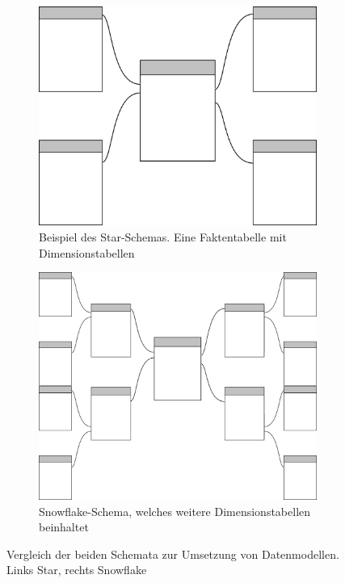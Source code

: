\begin{figure}[ht]
\begin{subfigure}{0.5\linewidth}
  \centering
  \includegraphics[width=0.95\linewidth]{img/starScheme}  
  \caption{Beispiel des Star-Schemas. Eine Faktentabelle mit Dimensionstabellen}
  \label{fig:starscheme}
\end{subfigure}
\begin{subfigure}{0.5\linewidth}
  \centering
  \includegraphics[width=0.95\linewidth]{img/snow}  
  \caption{Snowflake-Schema, welches weitere Dimensionstabellen beinhaltet}
  \label{fig:snow}
\end{subfigure}
\caption[Vergleich des Star- und Snowflake-Schemas]{Vergleich der beiden Schemata zur Umsetzung von Datenmodellen. Links Star, rechts Snowflake}
\label{fig:compScheme}
\end{figure}

